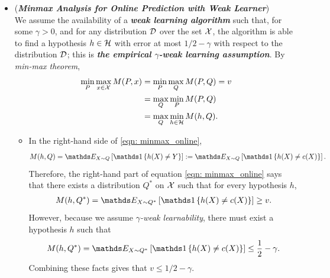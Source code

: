 \documentclass[11pt]{article}
\begin{document}
\begin{itemize}
\item \begin{remark} (\textbf{\emph{Minmax Analysis for Online Prediction with Weak Learner}})\\
We assume the availability of a \emph{\textbf{weak learning algorithm}} such that, for some $\gamma > 0$, and for any distribution ${\mathcal D}$ over the set ${\mathcal X}$, the algorithm is able to find a hypothesis $h \in {\mathcal H}$ with error at most $1/2 - \gamma$ with respect to the distribution ${\mathcal D}$; this is \emph{\textbf{the empirical $\gamma$-weak learning assumption}}. By \emph{min-max theorem}, 
\begin{align}
\min_{P}\max_{x \in {\mathcal X}}M(P, x) &= \min_{P}\max_{Q}M(P, Q) = v \nonumber\\
&= \max_{Q}\min_{P}M(P, Q) \nonumber\\
&= \max_{Q}\min_{h \in {\mathcal H}}M(h, Q). \label{eqn: minmax_online}
\end{align} 
\begin{itemize} 
\item In the right-hand side of \eqref{eqn: minmax_online},
\begin{align*}
M(h, Q) = \E{X \sim Q}{\ind{h(X) \neq Y}} :=\E{X \sim Q}{\ind{h(X) \neq c(X)}}.
\end{align*} Therefore, the right-hand part of equation \eqref{eqn: minmax_online} says that there exists a distribution $Q^{*}$ on ${\mathcal X}$ such that for every hypothesis $h$, 
\begin{align*}
M(h, Q^{*}) = \E{X \sim Q^{*}}{\ind{h(X) \neq c(X)}} \ge v.
\end{align*} However, because we assume \emph{$\gamma$-weak learnability}, there must exist a hypothesis $h$ such that
\begin{align*}
M(h, Q^{*}) = \E{X \sim Q^{*}}{\ind{h(X) \neq c(X)}} \le \frac{1}{2} - \gamma.
\end{align*} Combining these facts gives that $v \le 1/2 - \gamma$.


\end{itemize}
\end{remark}
\end{itemize}
\end{document}
